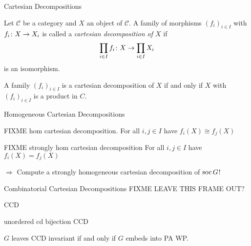 \begin{frame}{Cartesian Decompositions}
    \begin{defn}
        Let $\mathcal C$ be a category and $X$ an object of $\mathcal C$.
        A family of morphisms $(f_i)_{i \in I}$ with
        $f_i \colon X \rightarrow X_i$
        is called a
        \emph{cartesian decomposition of $X$}
        if
        \[
            \prod_{i \in I} f_i
            \colon
            X
            \rightarrow
            \prod_{i \in I} X_i
        \]
        is an isomorphism.
    \end{defn}

    \begin{lemma}
        A family $(f_i)_{i \in I}$ is a cartesian decomposition of $X$
        if and only if
        $X$ with $(f_i)_{i \in I}$ is a product in $C$.
    \end{lemma}
\end{frame}

\begin{frame}{Homogeneous Cartesian Decompositions}
    \begin{defn}
        FIXME hom cartesian decomposition.
        For all $i,j \in I$ have $f_i(X) \cong f_j(X)$
    \end{defn}

    \begin{defn}
        FIXME strongly hom cartesian decomposition
        For all $i,j \in I$ have $f_i(X) = f_j(X)$
    \end{defn}

    $\Rightarrow$
    Compute a strongly homogeneous cartesian decomposition of $\operatorname{soc} G$!
\end{frame}

\begin{frame}{Combinatorial Cartesian Decompositions}
    FIXME LEAVE THIS FRAME OUT?
    \begin{defn}
        CCD
    \end{defn}

    \begin{lemma}
        unordered cd bijection CCD
    \end{lemma}

    \begin{thm}
        $G$ leaves CCD invariant
        if and only if
        $G$ embeds into PA WP.
    \end{thm}
\end{frame}
